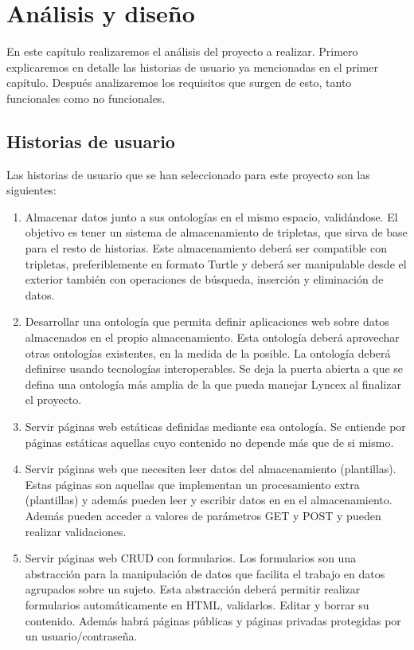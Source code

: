 \documentclass[12pt]{report} %
\begin{document}
\chapter{Análisis y diseño}

En este capítulo realizaremos el análisis del proyecto a realizar. Primero explicaremos en detalle las historias de usuario ya mencionadas en el primer capítulo. Después analizaremos los requisitos que surgen de esto, tanto funcionales como no funcionales.

\section{Historias de usuario}

Las historias de usuario que se han seleccionado para este proyecto son las siguientes:

\begin{enumerate}
    \item Almacenar datos junto a sus ontologías en el mismo espacio, validándose. El objetivo es tener un sistema de almacenamiento de tripletas, que sirva de base para el resto de historias. Este almacenamiento deberá ser compatible con tripletas, preferiblemente en formato Turtle y deberá ser manipulable desde el exterior también con operaciones de búsqueda, inserción y eliminación de datos.
    \item Desarrollar una ontología que permita definir aplicaciones web sobre datos almacenados en el propio almacenamiento. Esta ontología deberá aprovechar otras ontologías existentes, en la medida de la posible. La ontología deberá definirse usando tecnologías interoperables. Se deja la puerta abierta a que se defina una ontología más amplia de la que pueda manejar Lyncex al finalizar el proyecto.
    \item Servir páginas web estáticas definidas mediante esa ontología. Se entiende por páginas estáticas aquellas cuyo contenido no depende más que de si mismo.
    \item Servir páginas web que necesiten leer datos del almacenamiento (plantillas). Estas páginas son aquellas que implementan un procesamiento extra (plantillas) y además pueden leer y escribir datos en en el almacenamiento. Además pueden acceder a valores de parámetros GET y POST y pueden realizar validaciones.
    \item Servir páginas web CRUD con formularios. Los formularios son una abstracción para la manipulación de datos que facilita el trabajo en datos agrupados sobre un sujeto. Esta abstracción deberá permitir realizar formularios automáticamente en HTML, validarlos. Editar y borrar su contenido. Además habrá páginas públicas y páginas privadas protegidas por un usuario/contraseña.
\end{enumerate}
\end{document}
